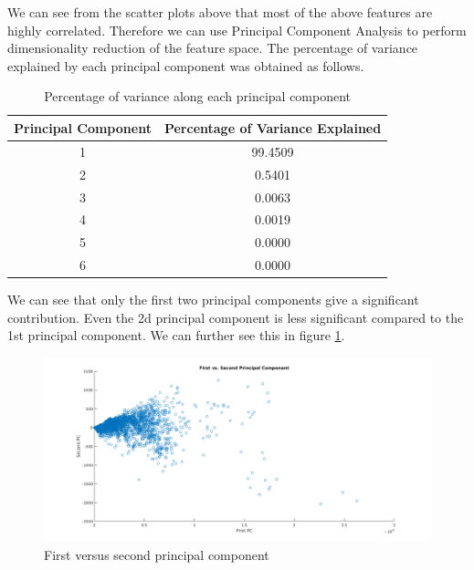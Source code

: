 \documentclass[12pt,a4paper]{report}
\begin{document}
We can see from the scatter plots above that most of the above features are highly correlated. Therefore we can use Principal Component Analysis to perform dimensionality reduction of the feature space. The percentage of variance explained by each principal component was obtained as follows.\\

\begin{table}[]
\centering
\caption{Percentage of variance along each principal component}
\label{pca-table}
\begin{tabular}{|c|c|}
\hline
\textbf{Principal Component} & \textbf{Percentage of Variance Explained} \\ \hline
1                            & 99.4509                                   \\ \hline
2                            & 0.5401                                    \\ \hline
3                            & 0.0063                                    \\ \hline
4                            & 0.0019                                    \\ \hline
5                            & 0.0000                                    \\ \hline
6                            & 0.0000                                    \\ \hline
\end{tabular}
\end{table}

We can see that only the first two principal components give a significant contribution. Even the 2d principal component is less significant compared to the 1st principal component. We can further see this in figure \ref{pca2}.

\begin{figure}[H]
\includegraphics[width=\textwidth]{pca/1_2_pca.png}
\centering
\caption{First versus second principal component}
\label{pca2}
\end{figure}
\end{document}
